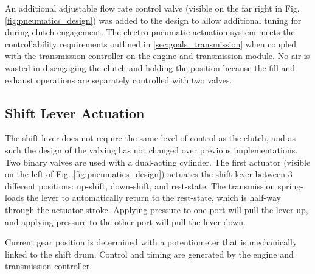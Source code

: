 An additional adjustable flow rate control valve (visible on the far right in Fig. \ref{fig:pneumatics_design}) was added to the design to allow additional tuning for during clutch engagement. The electro-pneumatic actuation system meets the controllability requirements outlined in \ref{sec:goals_transmission} when coupled with the transmission controller on the engine and transmission module. No air is wasted in disengaging the clutch and holding the position because the fill and exhaust operations are separately controlled with two valves.

\subsection{Shift Lever Actuation}

The shift lever does not require the same level of control as the clutch, and as such the design of the valving has not changed over previous implementations. Two binary valves are used with a dual-acting cylinder. The first actuator (visible on the left of Fig. \ref{fig:pneumatics_design}) actuates the shift lever between 3 different positions: up-shift, down-shift, and rest-state. The transmission spring-loads the lever to automatically return to the rest-state, which is half-way through the actuator stroke. Applying pressure to one port will pull the lever up, and applying pressure to the other port will pull the lever down.

Current gear position is determined with a potentiometer that is mechanically linked to the shift drum. Control and timing are generated by the engine and transmission controller.
